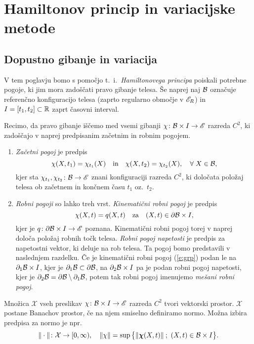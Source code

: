 \chapter{Hamiltonov princip in variacijske metode}


\section{Dopustno gibanje in variacija}


V tem poglavju bomo s pomočjo t.~i.~\emph{Hamiltonovega principa} poiskali potrebne pogoje,
ki jim mora zadoščati pravo gibanje telesa. Še naprej naj $\mathcal B$ označuje referenčno konfiguracijo
telesa (zaprto regularno območje v $\mathscr E_R$) in $I=[t_1,t_2]\subset\mathbb R$ zaprt časovni interval.

Recimo, da pravo gibanje iščemo med vsemi gibanji
$\chi\colon \mathcal B\times I\to\mathscr E$ razreda $C^2$, ki zadoščajo v naprej predpisanim začetnim
in robnim pogojem.
\begin{enumerate}
	\item \emph{Začetni pogoj} je predpis
		\begin{equation} \label{e:zacetnipogoj}
			\chi(X,t_1)=\chi_{t_1}(X)\quad\textrm{in}\quad \chi(X,t_2)=\chi_{t_2}(X),\quad\forall\;X\in\mathcal B,
		\end{equation}
		kjer sta $\chi_{t_1},\chi_{t_2}\colon \mathcal B\to\mathscr E$ znani konfiguraciji razreda $C^2$, ki
		določata položaj telesa ob začetnem in končnem času $t_1$ oz.~$t_2$.
	\item \emph{Robni pogoji} so lahko treh vrst. \emph{Kinematični robni pogoj} je predpis
		\begin{equation} \label{e:grp}
			\chi(X,t)=q(X,t)\quad\mathrm{za}\quad (X,t)\in \partial\mathcal B\times I,
		\end{equation}
		kjer je $q\colon\partial\mathcal B\times I\to\mathscr E$ poznana.
		Kinematični robni pogoj torej v naprej določa položaj robnih točk telesa.
		\emph{Robni pogoj napetosti} je predpis za napetostni vektor, ki deluje na rob telesa.
		Ta pogoj bomo predstavili v naslednjem razdelku. Če je kinematični robni pogoj (\ref{e:grp})
		podan le na $\partial_1\mathcal B\times I$, kjer je $\partial_1\mathcal B\subset\partial\mathcal B$, na
		$\partial_2\mathcal B\times I$ pa je podan robni pogoj napetosti, kjer je $\partial_2\mathcal B=\partial\mathcal B\setminus\partial_1\mathcal B$,
		potem tak robni pogoj imenujemo \emph{mešani robni pogoj}.
\end{enumerate}

Množica $\mathcal{X}$ vseh preslikav $\chi\colon \mathcal B\times I\to\mathscr E$
razreda $C^2$ tvori vektorski prostor.
$\mathcal{X}$ postane Banachov prostor, če na njem smiselno definiramo normo. Možna izbira
predpisa za normo je npr.
\[
	\|\cdot\|\colon\mathcal{X}\to[0,\infty),\quad
	\|\chi\|=\sup\big\{\|\boldsymbol \chi(X,t)\|\: ;\ (X,t)\in \mathcal B\times I\big\}.
\]

